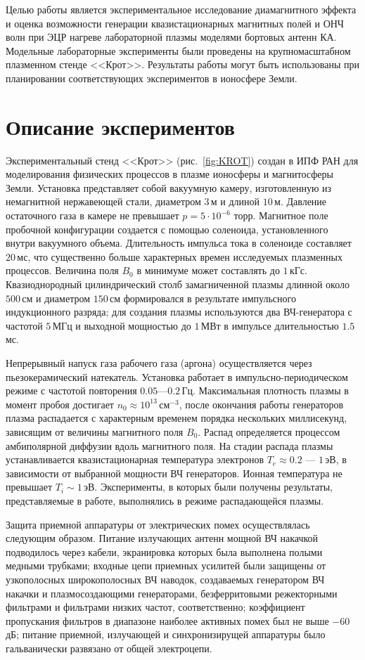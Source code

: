 \documentclass[10pt]{disser}
\begin{document}
Целью работы является экспериментальное исследование диамагнитного эффекта и оценка возможности генерации квазистационарных магнитных полей и ОНЧ волн при ЭЦР нагреве лабораторной плазмы моделями бортовых антенн КА. Модельные лабораторные эксперименты были проведены на крупномасштабном плазменном стенде <<Крот>>. Результаты работы могут быть использованы при планировании соответствующих экспериментов в ионосфере Земли.
\section{Описание экспериментов}
Экспериментальный стенд <<Крот>> (\mbox{рис.~\ref{fig:KROT}}) создан в ИПФ РАН для моделирования физических процессов в плазме ионосферы и магнитосферы Земли. Установка представляет собой вакуумную камеру, изготовленную из немагнитной нержавеющей стали, диаметром $3$\,м и длиной $10$\,м.  Давление остаточного газа в камере не превышает  $p = 5\cdot10^{-6}$ торр. 
Магнитное поле пробочной конфигурации создается с помощью соленоида, установленного внутри вакуумного объема. Длительность импульса тока в соленоиде составляет $20$\,мс, что существенно больше характерных времен исследуемых плазменных процессов. Величина поля $B_{0}$ в минимуме может составлять до $1$\,кГс.
Квазиоднородный цилиндрический столб замагниченной плазмы длинной около $500$\,см и диаметром $150$\,см формировался в результате импульсного индукционного разряда; для создания плазмы используются два ВЧ-генератора с частотой $5$\,МГц и выходной мощностью до $1$\,МВт в импульсе длительностью $1.5$\,мс.

Непрерывный напуск газа рабочего газа (аргона) осуществляется через пьезокерамический натекатель. Установка работает в импульсно-периодическом режиме с частотой повторения $0.05$---$0.2$\,Гц. Максимальная плотность плазмы в момент пробоя достигает $n_{0} \approx 10^{13}$\,см$^{-3}$, после окончания работы генераторов плазма распадается с характерным временем порядка нескольких миллисекунд, зависящим от величины магнитного поля $B_{0}$. Распад определяется процессом амбиполярной диффузии вдоль магнитного поля. На стадии распада плазмы устанавливается квазистационарная температура электронов $T_{e} \approx 0.2$ --- $1$\,эВ, в зависимости от выбранной мощности ВЧ генераторов. Ионная температура не превышает $T_{i} \sim 1$\,эВ. Эксперименты, в которых были получены результаты, представляемые в работе, выполнялись в режиме распадающейся плазмы.

Защита приемной аппаратуры от электрических помех  осуществлялась следующим образом.  Питание излучающих антенн мощной ВЧ накачкой подводилось через кабели, экранировка которых была выполнена полыми медными трубками; входные цепи приемных усилитей были защищены от узкополосных широкополосных ВЧ наводок, создаваемых генератором ВЧ накачки и плазмосоздающими генераторами, безферритовыми режекторными фильтрами и фильтрами низких частот, соответственно; коэффициент пропускания фильтров в диапазоне наиболее активных помех был не выше $-60$\,дБ; питание приемной, излучающей и синхронизирущей аппаратуры было гальванически развязано от общей электроцепи.
\end{document}

